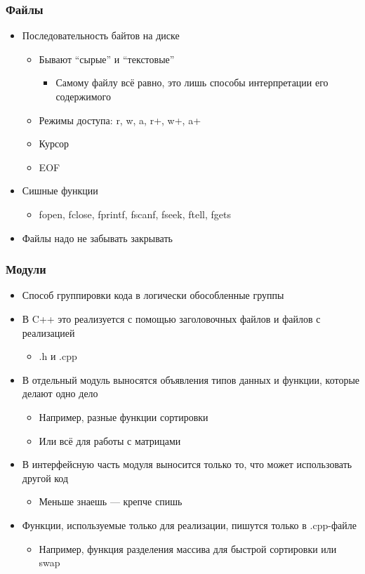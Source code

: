 \documentclass[xetex,mathserif,serif]{beamer}
\begin{document}
	\begin{frame}
		\frametitle{Файлы}
		\begin{itemize}
			\item Последовательность байтов на диске
			\begin{itemize}
				\item Бывают ``сырые'' и ``текстовые''
				\begin{itemize}
					\item Самому файлу всё равно, это лишь способы интерпретации его содержимого
				\end{itemize}
				\item Режимы доступа: r, w, a, r+, w+, a+
				\item Курсор
				\item EOF
			\end{itemize}
			\item Сишные функции
			\begin{itemize}
				\item fopen, fclose, fprintf, fscanf, fseek, ftell, fgets
			\end{itemize}
			\item Файлы надо не забывать закрывать
		\end{itemize}
	\end{frame}

	\begin{frame}[fragile]
		\frametitle{Модули}
		\begin{itemize}
			\item Способ группировки кода в логически обособленные группы
			\item В C++ это реализуется с помощью заголовочных файлов и файлов с реализацией
			\begin{itemize}
				\item .h и .cpp
			\end{itemize}
			\item В отдельный модуль выносятся объявления типов данных и функции, которые делают одно дело
			\begin{itemize}
				\item Например, разные функции сортировки
				\item Или всё для работы с матрицами
			\end{itemize}
			\item В интерфейсную часть модуля выносится только то, что может использовать другой код
			\begin{itemize}
				\item Меньше знаешь --- крепче спишь
			\end{itemize}
			\item Функции, используемые только для реализации, пишутся только в .cpp-файле
			\begin{itemize}
				\item Например, функция разделения массива для быстрой сортировки или swap
			\end{itemize}
		\end{itemize}
	\end{frame}
\end{document}
